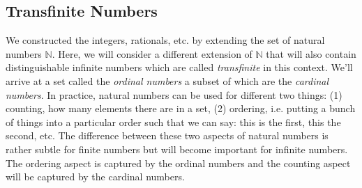 




\subsection{Transfinite Numbers}
We constructed the integers, rationals, etc. by extending the set of natural numbers $\mathbb{N}$. Here, we will consider a different extension of $\mathbb{N}$ that will also contain distinguishable infinite numbers which are called \emph{transfinite} in this context. We'll arrive at a set called the \emph{ordinal numbers} a subset of which are the \emph{cardinal numbers}. In practice, natural numbers can be used for different two things: (1) counting, how many elements there are in a set, (2) ordering, i.e. putting a bunch of things into a particular order such that we can say: this is the first, this the second, etc. The difference between these two aspects of natural numbers is rather subtle for finite numbers but will become important for infinite numbers. The ordering aspect is captured by the ordinal numbers and the counting aspect will be captured by the cardinal numbers.



